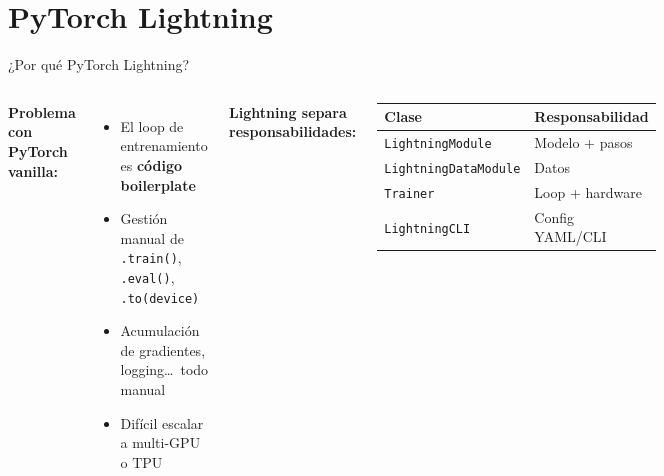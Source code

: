 \documentclass[aspectratio=169,10pt]{beamer}
\begin{document}
\section{PyTorch Lightning}

\begin{frame}{¿Por qué PyTorch Lightning?}
    \begin{columns}
        \textbf{Problema con PyTorch vanilla:}
        \begin{itemize}
            \item El loop de entrenamiento es \textbf{código boilerplate}
            \item Gestión manual de \texttt{.train()}, \texttt{.eval()}, \texttt{.to(device)}
            \item Acumulación de gradientes, logging\ldots\ todo manual
            \item Difícil escalar a multi-GPU o TPU
        \end{itemize}

        \textbf{Lightning separa responsabilidades:}
        \begin{tcolorbox}[colback=lightgray, colframe=pyblue!60]
            \scriptsize
            \begin{tabular}{ll}
                \toprule
                Clase & Responsabilidad \\
                \midrule
                \texttt{LightningModule}  & Modelo + pasos \\
                \texttt{LightningDataModule} & Datos \\
                \texttt{Trainer}          & Loop + hardware \\
                \texttt{LightningCLI}     & Config YAML/CLI \\
                \bottomrule
            \end{tabular}
        \end{tcolorbox}
    \end{columns}

    \vspace{8pt}
    \begin{center}
    \end{center}
\end{frame}
\end{document}
